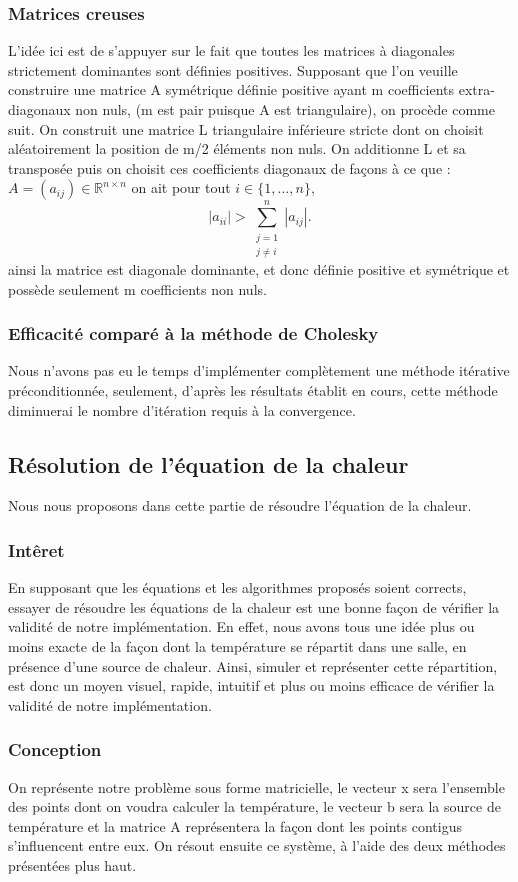 \documentclass{article}
\begin{document}
\subsubsection*{Matrices creuses}
L'idée ici est de s'appuyer sur le fait que toutes les matrices à diagonales strictement dominantes sont définies positives.
Supposant que l'on veuille construire une matrice A symétrique définie positive ayant m coefficients extra-diagonaux non nuls, (m est pair puisque A est triangulaire), on procède comme suit.
On construit une matrice L triangulaire inférieure stricte dont on choisit aléatoirement la position de m/2 éléments non nuls. On additionne L et sa transposée puis on choisit ces coefficients diagonaux de façons à ce que :\( A = (a_{ij}) \in \mathbb{R}^{n \times n} \) on ait pour tout \( i \in \{1, \dots, n\} \),
\[
|a_{ii}| > \sum_{\substack{j=1 \\ j \neq i}}^{n} |a_{ij}|.
\]
 ainsi la matrice est diagonale dominante, et donc définie positive et symétrique et possède seulement m coefficients non nuls.
\subsubsection*{Efficacité comparé à la méthode de Cholesky}
Nous n'avons pas eu le temps d'implémenter complètement une méthode itérative préconditionnée, seulement, d'après les résultats établit en cours, cette méthode diminuerai le nombre d'itération requis à la convergence.
\subsection*{Résolution de l'équation de la chaleur}
Nous nous proposons dans cette partie de résoudre l'équation de la chaleur.
\subsubsection{Intêret}
En supposant que les équations et les algorithmes proposés soient corrects, essayer de résoudre les équations de la chaleur est une bonne façon de vérifier la validité de notre implémentation.
En effet, nous avons tous une idée plus ou moins exacte de la façon dont la température se répartit dans une salle, en présence d'une source de chaleur.
Ainsi, simuler et représenter cette répartition, est donc un moyen visuel, rapide, intuitif et plus ou moins efficace de vérifier la validité de notre implémentation.
\subsubsection*{Conception}
On représente notre problème sous forme matricielle, le vecteur x sera l'ensemble des points dont on voudra calculer la température, le vecteur b sera la source de température et la matrice A représentera la façon dont les points contigus s'influencent entre eux.
On résout ensuite ce système, à l'aide des deux méthodes présentées plus haut.
\end{document}
